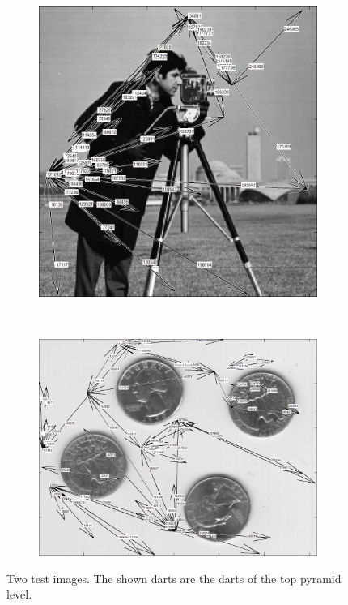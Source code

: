 \documentclass[12pt]{article}
\begin{document}
\begin{figure}[tb]
  \centering

    \begin{subfigure}[b]{0.4\textwidth}
      \includegraphics[width=\textwidth]{img/result.jpg}
      \caption{}\label{fig:result1}
    \end{subfigure}~%
    \begin{subfigure}[b]{0.4\textwidth}
      \includegraphics[width=\textwidth]{img/result2.jpg}
      \caption{}\label{fig:result2}
    \end{subfigure}
  \caption{Two test images. The shown darts are the darts of the top pyramid level.}\label{fig:result}
\end{figure}
\end{document}
